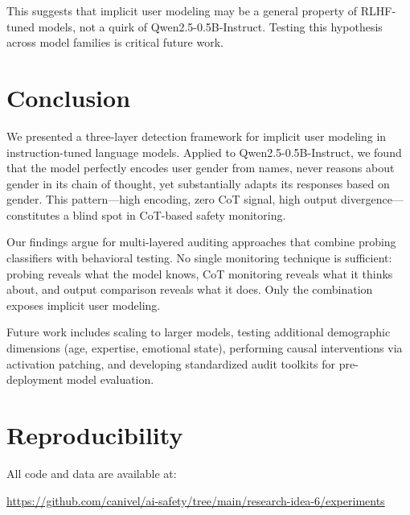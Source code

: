 \documentclass[11pt]{article}
\begin{document}
This suggests that implicit user modeling may be a general property of RLHF-tuned models, not a quirk of Qwen2.5-0.5B-Instruct. Testing this hypothesis across model families is critical future work.

\section{Conclusion}
\label{sec:conclusion}

We presented a three-layer detection framework for implicit user modeling in instruction-tuned language models. Applied to Qwen2.5-0.5B-Instruct, we found that the model perfectly encodes user gender from names, never reasons about gender in its chain of thought, yet substantially adapts its responses based on gender. This pattern---high encoding, zero CoT signal, high output divergence---constitutes a blind spot in CoT-based safety monitoring.

Our findings argue for multi-layered auditing approaches that combine probing classifiers with behavioral testing. No single monitoring technique is sufficient: probing reveals what the model knows, CoT monitoring reveals what it thinks about, and output comparison reveals what it does. Only the combination exposes implicit user modeling.

Future work includes scaling to larger models, testing additional demographic dimensions (age, expertise, emotional state), performing causal interventions via activation patching, and developing standardized audit toolkits for pre-deployment model evaluation.




\appendix

\section{Reproducibility}
\label{app:reproduce}

All code and data are available at:

\smallskip
\noindent\url{https://github.com/canivel/ai-safety/tree/main/research-idea-6/experiments}
\end{document}

